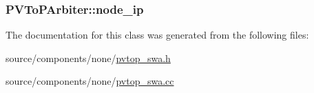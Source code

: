 \hypertarget{classPVToPArbiter_eda318acf7d024850c7d36a44250792b}{
\subsubsection[{node\_\-ip}]{ {\bf PVToPArbiter::node\_\-ip}}}
\label{classPVToPArbiter_eda318acf7d024850c7d36a44250792b}




The documentation for this class was generated from the following files:\begin{CompactItemize}
\item 
source/components/none/\hyperlink{pvtop__swa_8h}{pvtop\_\-swa.h}\item 
source/components/none/\hyperlink{pvtop__swa_8cc}{pvtop\_\-swa.cc}\end{CompactItemize}
